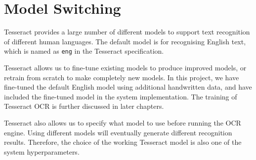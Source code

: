 \section{Model Switching}

Tesseract provides a large number of different models to support text recognition of different human languages. The default model is for recognising English text, which is named as \texttt{eng} in the Tesseract specification. 

Tesseract allows us to fine-tune existing models to produce improved models, or retrain from scratch to make completely new models. In this project, we have fine-tuned the default English model using additional handwritten data, and have included the fine-tuned model in the system implementation. The training of Tesseract OCR is further discussed in later chapters. 

Tesseract also allows us to specify what model to use before running the OCR engine. Using different models will eventually generate different recognition results. Therefore, the choice of the working Tesseract model is also one of the system hyperparameters.


